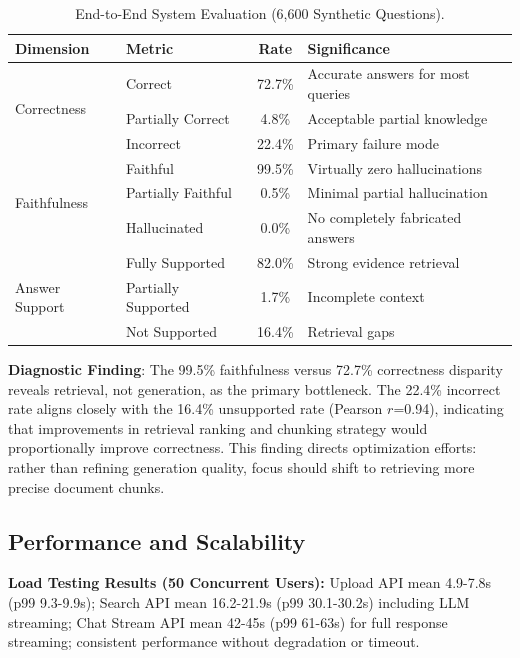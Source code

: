 \documentclass[11pt,a4paper,twocolumn]{article}
\begin{document}
\begin{table}[t]
\caption{End-to-End System Evaluation (6,600 Synthetic Questions).}
\label{tab:end-to-end-eval}
\centering
\begin{tabular}{llcl}
\toprule
\textbf{Dimension} & \textbf{Metric} & \textbf{Rate} & \textbf{Significance} \\
\midrule
\multirow{3}{*}{Correctness} & Correct & 72.7\% & Accurate answers for most queries \\
 & Partially Correct & 4.8\% & Acceptable partial knowledge \\
 & Incorrect & 22.4\% & Primary failure mode \\
\midrule
\multirow{3}{*}{Faithfulness} & Faithful & 99.5\% & Virtually zero hallucinations \\
 & Partially Faithful & 0.5\% & Minimal partial hallucination \\
 & Hallucinated & 0.0\% & No completely fabricated answers \\
\midrule
\multirow{3}{*}{Answer Support} & Fully Supported & 82.0\% & Strong evidence retrieval \\
 & Partially Supported & 1.7\% & Incomplete context \\
 & Not Supported & 16.4\% & Retrieval gaps \\
\bottomrule
\end{tabular}
\end{table}

\textbf{Diagnostic Finding}: The 99.5\% faithfulness versus 72.7\% correctness disparity reveals retrieval, not generation, as the primary bottleneck. The 22.4\% incorrect rate aligns closely with the 16.4\% unsupported rate (Pearson $r$=0.94), indicating that improvements in retrieval ranking and chunking strategy would proportionally improve correctness. This finding directs optimization efforts: rather than refining generation quality, focus should shift to retrieving more precise document chunks.

\subsection{Performance and Scalability}

\textbf{Load Testing Results (50 Concurrent Users):} Upload API mean 4.9-7.8s (p99 9.3-9.9s); Search API mean 16.2-21.9s (p99 30.1-30.2s) including LLM streaming; Chat Stream API mean 42-45s (p99 61-63s) for full response streaming; consistent performance without degradation or timeout.
\end{document}

